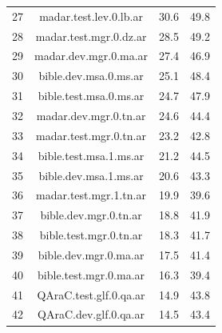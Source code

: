 \begin{table}[htbp]
\begin{tabular}{l@{\hspace{3pt}}c@{\hspace{3pt}}c@{\hspace{3pt}}c}
27 & madar.test.lev.0.lb.ar & 30.6 & 49.8 \\
28 & madar.test.mgr.0.dz.ar & 28.5 & 49.2 \\
29 & madar.dev.mgr.0.ma.ar & 27.4 & 46.9 \\
30 & bible.dev.msa.0.ms.ar & 25.1 & 48.4 \\
31 & bible.test.msa.0.ms.ar & 24.7 & 47.9 \\
32 & madar.dev.mgr.0.tn.ar & 24.6 & 44.4 \\
33 & madar.test.mgr.0.tn.ar & 23.2 & 42.8 \\
34 & bible.test.msa.1.ms.ar & 21.2 & 44.5 \\
35 & bible.dev.msa.1.ms.ar & 20.6 & 43.3 \\
36 & madar.test.mgr.1.tn.ar & 19.9 & 39.6 \\
37 & bible.dev.mgr.0.tn.ar & 18.8 & 41.9 \\
38 & bible.test.mgr.0.tn.ar & 18.3 & 41.7 \\
39 & bible.dev.mgr.0.ma.ar & 17.5 & 41.4 \\
40 & bible.test.mgr.0.ma.ar & 16.3 & 39.4 \\
41 & QAraC.test.glf.0.qa.ar & 14.9 & 43.8 \\
42 & QAraC.dev.glf.0.qa.ar & 14.5 & 43.4 \\
\bottomrule
\end{tabular}
\end{table}